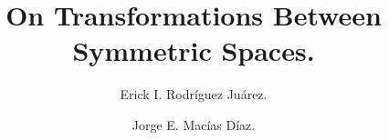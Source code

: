 
\usepackage{amsmath}
\usepackage{amsfonts}
\usepackage{amssymb}
\usepackage{graphicx}
\usepackage{mathrsfs}

\title{On Transformations Between Symmetric Spaces.}

\author{Erick I. Rodríguez Juárez.}
\address{Aguascalientes. Ags}

\author{Jorge E. Macías Díaz.}
\address{Aguascalientes. Ags}

\newtheorem{theorem}{Theorem}[section]
\newtheorem{lemma}[theorem]{Lemma}
\newtheorem{corollary}[theorem]{Corollary}

\theoremstyle{definition}
\newtheorem{definition}[theorem]{Definition}
\newtheorem{example}[theorem]{Example}
\newtheorem{xca}[theorem]{Exercise}

\theoremstyle{remark}
\newtheorem{remark}[theorem]{Remark}


\newcommand{\dis}{\displaystyle}
